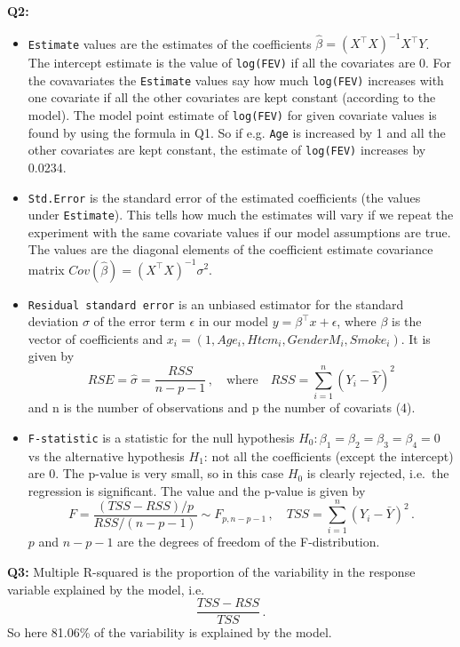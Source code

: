 \documentclass[]{article}
\providecommand{\tightlist}{%
  \setlength{\itemsep}{0pt}\setlength{\parskip}{0pt}}
\begin{document}
\textbf{Q2:}

\begin{itemize}
\tightlist
\item
  \texttt{Estimate} values are the estimates of the coefficients
  \(\hat{\beta}=(X^\intercal X)^{-1}X^\intercal Y\). The intercept
  estimate is the value of \texttt{log(FEV)} if all the covariates are
  0. For the covavariates the \texttt{Estimate} values say how much
  \texttt{log(FEV)} increases with one covariate if all the other
  covariates are kept constant (according to the model). The model point
  estimate of \texttt{log(FEV)} for given covariate values is found by
  using the formula in Q1. So if e.g. \texttt{Age} is increased by 1 and
  all the other covariates are kept constant, the estimate of
  \texttt{log(FEV)} increases by 0.0234.
\item
  \texttt{Std.Error} is the standard error of the estimated coefficients
  (the values under \texttt{Estimate}). This tells how much the
  estimates will vary if we repeat the experiment with the same
  covariate values if our model assumptions are true. The values are the
  diagonal elements of the coefficient estimate covariance matrix
  \(Cov(\hat{\beta})=(X^\intercal X)^{-1}\sigma^2\).
\item
  \texttt{Residual\ standard\ error} is an unbiased estimator for the
  standard deviation \(\sigma\) of the error term \(\epsilon\) in our
  model \(y = \beta^\intercal x +  \epsilon\), where \(\beta\) is the
  vector of coefficients and
  \(x_i = (1, Age_i,  Htcm_i, GenderM_i, Smoke_i)\). It is given by
  \[RSE = \hat{\sigma} = \frac{RSS}{n-p-1} \, , \quad \text{where} \quad RSS = 
    \sum_{i=1}^n(Y_i-\hat{Y})^2\] and n is the number of observations
  and p the number of covariats (4).
\item
  \texttt{F-statistic} is a statistic for the null hypothesis
  \(H_0:\beta_1=\beta_2=\beta_3=\beta_4=0\) vs the alternative
  hypothesis \(H_1\): not all the coefficients (except the intercept)
  are 0. The p-value is very small, so in this case \(H_0\) is clearly
  rejected, i.e.~the regression is significant. The value and the
  p-value is given by
  \[F = \frac{(TSS-RSS)/p}{RSS/(n-p-1)} \sim F_{p, n-p-1}\, , \quad
    TSS = \sum_{i=1}^n(Y_i-\bar{Y})^2 \, .\] \(p\) and \(n-p-1\) are the
  degrees of freedom of the F-distribution.
\end{itemize}

\textbf{Q3:} Multiple R-squared is the proportion of the variability in
the response variable explained by the model, i.e.
\[\frac{TSS-RSS}{TSS} \, .\] So here 81.06\% of the variability is
explained by the model.
\end{document}
